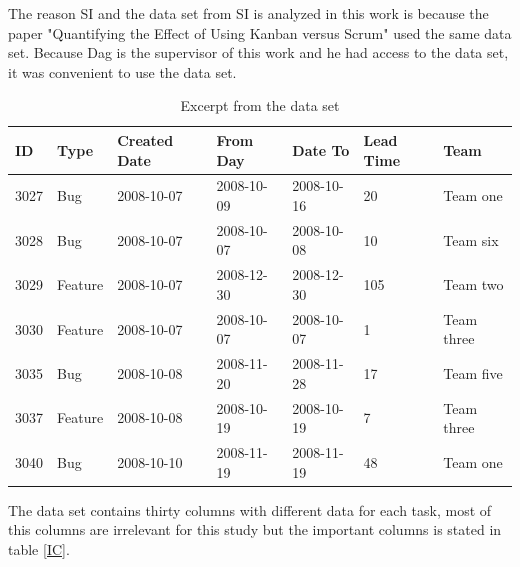 \documentclass[UKenglish]{ifimaster}  %
\begin{document}
The reason SI and the data set from SI is analyzed in this work is because the paper "Quantifying the Effect of Using Kanban versus Scrum" \parencite{Dag} used the same data set. Because Dag is the supervisor of this work and he had access to the data set, it was convenient to use the data set.

\begin{table}[!ht]
\begin{center}
\begin{tabular}{|l|l|l|l|l|l|l|}
\hline
ID	& Type &  Created Date & From Day & Date To & Lead Time & Team \\ \hline
    3027 & Bug & 2008-10-07 &  2008-10-09 & 2008-10-16 & 20 & Team one\\ \hline
   3028 & Bug  & 2008-10-07 & 2008-10-07 & 2008-10-08 & 10 & Team six\\ \hline
   3029 & Feature & 2008-10-07 &  2008-12-30	 & 2008-12-30 & 105 & Team two\\ \hline
    3030 & Feature & 2008-10-07 & 2008-10-07	& 2008-10-07 & 1& Team three\\ \hline
   3035 & Bug & 2008-10-08 & 2008-11-20 & 2008-11-28 & 17 & Team five\\ \hline
   3037 & Feature & 2008-10-08 &  2008-10-19	 & 2008-10-19 & 7 & Team three\\ \hline
   3040 & Bug & 2008-10-10 &  2008-11-19 & 2008-11-19 & 48 & Team one\\ \hline
   \end{tabular}
\caption{Excerpt from the data set}
\label{dataset}
\end{center}
\end{table}

The data set contains thirty columns with different data for each task, most of this columns are irrelevant for this study but the important columns is stated in table \ref{IC}.
\end{document}
